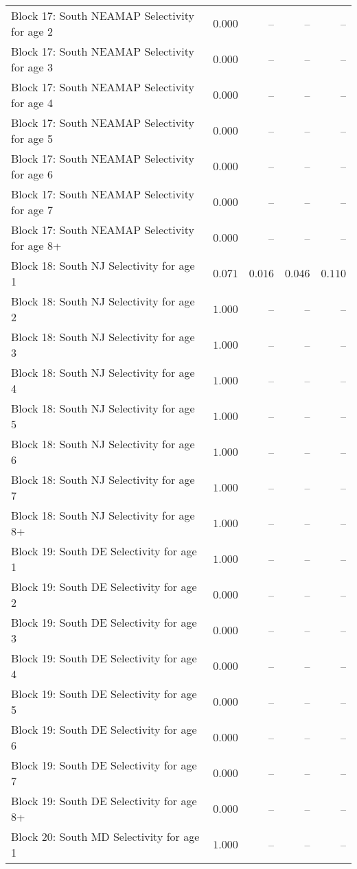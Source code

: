 \documentclass[
]{article}
\begin{document}
\begin{landscape}
\begin{longtable}[t]{lrrrr}
Block 17: South NEAMAP Selectivity for age 2 & $0.000$ & -- & -- & --\\
Block 17: South NEAMAP Selectivity for age 3 & $0.000$ & -- & -- & --\\
Block 17: South NEAMAP Selectivity for age 4 & $0.000$ & -- & -- & --\\
Block 17: South NEAMAP Selectivity for age 5 & $0.000$ & -- & -- & --\\
\addlinespace
Block 17: South NEAMAP Selectivity for age 6 & $0.000$ & -- & -- & --\\
Block 17: South NEAMAP Selectivity for age 7 & $0.000$ & -- & -- & --\\
Block 17: South NEAMAP Selectivity for age 8+ & $0.000$ & -- & -- & --\\
Block 18: South NJ Selectivity for age 1 & $0.071$ & $0.016$ & $0.046$ & $0.110$\\
Block 18: South NJ Selectivity for age 2 & $1.000$ & -- & -- & --\\
\addlinespace
Block 18: South NJ Selectivity for age 3 & $1.000$ & -- & -- & --\\
Block 18: South NJ Selectivity for age 4 & $1.000$ & -- & -- & --\\
Block 18: South NJ Selectivity for age 5 & $1.000$ & -- & -- & --\\
Block 18: South NJ Selectivity for age 6 & $1.000$ & -- & -- & --\\
Block 18: South NJ Selectivity for age 7 & $1.000$ & -- & -- & --\\
\addlinespace
Block 18: South NJ Selectivity for age 8+ & $1.000$ & -- & -- & --\\
Block 19: South DE Selectivity for age 1 & $1.000$ & -- & -- & --\\
Block 19: South DE Selectivity for age 2 & $0.000$ & -- & -- & --\\
Block 19: South DE Selectivity for age 3 & $0.000$ & -- & -- & --\\
Block 19: South DE Selectivity for age 4 & $0.000$ & -- & -- & --\\
\addlinespace
Block 19: South DE Selectivity for age 5 & $0.000$ & -- & -- & --\\
Block 19: South DE Selectivity for age 6 & $0.000$ & -- & -- & --\\
Block 19: South DE Selectivity for age 7 & $0.000$ & -- & -- & --\\
Block 19: South DE Selectivity for age 8+ & $0.000$ & -- & -- & --\\
Block 20: South MD Selectivity for age 1 & $1.000$ & -- & -- & --\\

\end{longtable}
\end{landscape}
\end{document}
